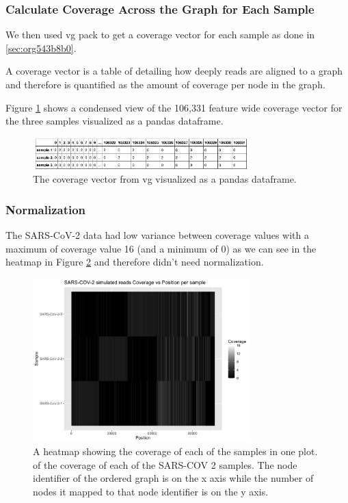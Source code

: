 \documentclass[10pt, a4paper]{article}
\begin{document}
\subsubsection{Calculate Coverage Across the Graph for Each Sample}
\label{sec:orga3b5bb3}
We then used vg pack to get a coverage vector for each sample as done in 
\ref{sec:org543b8b0}.

A coverage vector is a table of detailing how deeply reads are aligned to a 
graph and therefore is quantified as the amount of coverage per node in the graph.

Figure \ref{fig:org916fc26} shows a condensed view of the 106,331 feature
wide coverage vector for the three samples visualized as a pandas dataframe.

\begin{figure}[h]
\centering
\includegraphics[width=0.75\textwidth]{../Figures/SARS_CoV_2/SARS_Coverage_Vector.png}
\caption[SARS-CoV-2 Coverage Vector]{\label{fig:org916fc26}The coverage vector from vg visualized as a pandas dataframe.}
\end{figure}

\subsubsection{Normalization}
\label{sec:org48b1920}
The SARS-CoV-2 data had low variance between coverage values with a maximum of 
coverage value 16 (and a minimum of 0) as we can see in the heatmap in Figure
\ref{fig:orgf6a4a8b} and therefore didn’t need normalization.

\begin{figure}[h!]
\centering
\includegraphics[width=0.75\textwidth]{../Figures/SARS_CoV_2/Heatmap.png}
\caption[SARS-CoV-2 heatmap]{\label{fig:orgf6a4a8b}A heatmap showing the coverage of each of the samples in one plot. of the coverage of each of the SARS-COV 2 samples. The node identifier of the ordered graph is on the x axis while the number of nodes it mapped to that node identifier is on the y axis.}
\end{figure}
\end{document}
